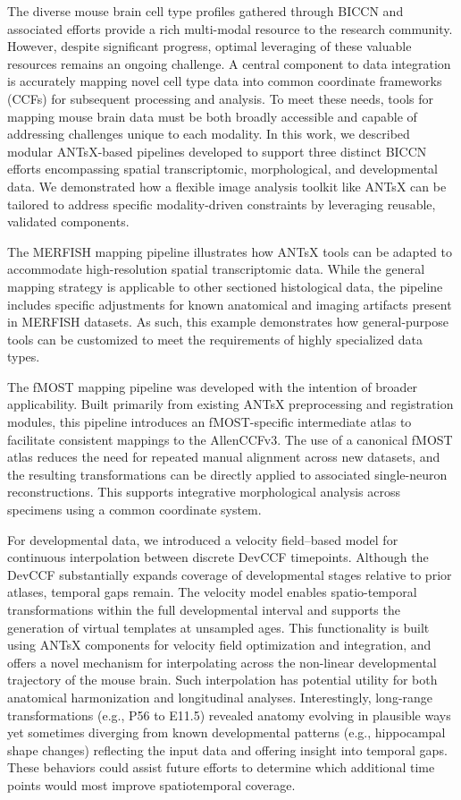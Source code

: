 \documentclass[
  12pt,
]{article}
\begin{document}
The diverse mouse brain cell type profiles gathered through BICCN and
associated efforts provide a rich multi-modal resource to the research
community. However, despite significant progress, optimal leveraging of
these valuable resources remains an ongoing challenge. A central
component to data integration is accurately mapping novel cell type data
into common coordinate frameworks (CCFs) for subsequent processing and
analysis. To meet these needs, tools for mapping mouse brain data must
be both broadly accessible and capable of addressing challenges unique
to each modality. In this work, we described modular ANTsX-based
pipelines developed to support three distinct BICCN efforts encompassing
spatial transcriptomic, morphological, and developmental data. We
demonstrated how a flexible image analysis toolkit like ANTsX can be
tailored to address specific modality-driven constraints by leveraging
reusable, validated components.

The MERFISH mapping pipeline illustrates how ANTsX tools can be adapted
to accommodate high-resolution spatial transcriptomic data. While the
general mapping strategy is applicable to other sectioned histological
data, the pipeline includes specific adjustments for known anatomical
and imaging artifacts present in MERFISH datasets. As such, this example
demonstrates how general-purpose tools can be customized to meet the
requirements of highly specialized data types.

The fMOST mapping pipeline was developed with the intention of broader
applicability. Built primarily from existing ANTsX preprocessing and
registration modules, this pipeline introduces an fMOST-specific
intermediate atlas to facilitate consistent mappings to the AllenCCFv3.
The use of a canonical fMOST atlas reduces the need for repeated manual
alignment across new datasets, and the resulting transformations can be
directly applied to associated single-neuron reconstructions. This
supports integrative morphological analysis across specimens using a
common coordinate system.

For developmental data, we introduced a velocity field--based model for
continuous interpolation between discrete DevCCF timepoints. Although
the DevCCF substantially expands coverage of developmental stages
relative to prior atlases, temporal gaps remain. The velocity model
enables spatio-temporal transformations within the full developmental
interval and supports the generation of virtual templates at unsampled
ages. This functionality is built using ANTsX components for velocity
field optimization and integration, and offers a novel mechanism for
interpolating across the non-linear developmental trajectory of the
mouse brain. Such interpolation has potential utility for both
anatomical harmonization and longitudinal analyses. Interestingly,
long-range transformations (e.g., P56 to E11.5) revealed anatomy
evolving in plausible ways yet sometimes diverging from known
developmental patterns (e.g., hippocampal shape changes) reflecting the
input data and offering insight into temporal gaps. These behaviors
could assist future efforts to determine which additional time points
would most improve spatiotemporal coverage.
\end{document}
